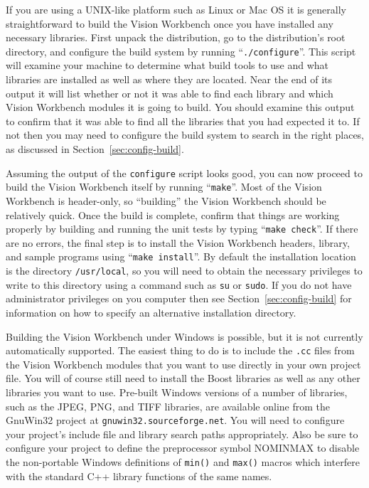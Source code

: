 If you are using a UNIX-like platform such as Linux or Mac OS it is
generally straightforward to build the Vision Workbench once you have
installed any necessary libraries.  First unpack the distribution, go
to the distribution's root directory, and configure the build system
by running ``\verb#./configure#''.  This script will examine your machine
to determine what build tools to use and what libraries are installed
as well as where they are located.  Near the end of its output it will
list whether or not it was able to find each library and which Vision
Workbench modules it is going to build.  You should examine this
output to confirm that it was able to find all the libraries that you
had expected it to.  If not then you may need to configure the build
system to search in the right places, as discussed in
Section~\ref{sec:config-build}.

Assuming the output of the \verb#configure# script looks good, you can
now proceed to build the Vision Workbench itself by running
``\verb#make#''.  Most of the Vision Workbench is header-only, so
``building'' the Vision Workbench should be relatively quick.  Once
the build is complete, confirm that things are working properly by
building and running the unit tests by typing ``\verb#make check#''.
If there are no errors, the final step is to install the Vision
Workbench headers, library, and sample programs using
``\verb#make install#''.  By default the installation location is the
directory \verb#/usr/local#, so you will need to obtain the necessary
privileges to write to this directory using a command such as
\verb#su# or \verb#sudo#.  If you do not have administrator privileges
on you computer then see Section~\ref{sec:config-build} for
information on how to specify an alternative installation directory.

Building the Vision Workbench under Windows is possible, but it is not
currently automatically supported.  The easiest thing to do is to
include the \verb#.cc# files from the Vision Workbench modules that
you want to use directly in your own project file.  You will of course
still need to install the Boost libraries as well as any other
libraries you want to use.  Pre-built Windows versions of a number of
libraries, such as the JPEG, PNG, and TIFF libraries, are available
online from the GnuWin32 project at \verb#gnuwin32.sourceforge.net#.
You will need to configure your project's include file and library
search paths appropriately.  Also be sure to configure your project to
define the preprocessor symbol NOMINMAX to disable the non-portable
Windows definitions of \verb#min()# and \verb#max()# macros which
interfere with the standard C++ library functions of the same names.

